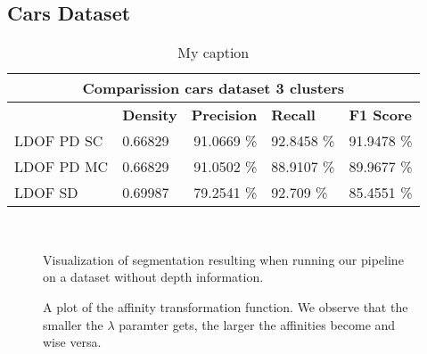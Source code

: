 \subsection{Cars Dataset}


\begin{table}[H]
\centering
\begin{tabular}{|l|l|r|l|l|}
\hline
\multicolumn{5}{|c|}{Comparission cars dataset 3 clusters}                        \\ \hline
              & \textbf{Density} & \textbf{Precision} & \textbf{Recall} & \textbf{F1 Score} \\ \hline
LDOF PD SC & 0.66829 & 91.0669 \%   & 92.8458 \%     & 91.9478 \%  \\ \hline
LDOF PD MC & 0.66829 & 91.0502 \%   & 88.9107 \%     & 89.9677 \%  \\ \hline              
LDOF SD & 0.69987 & 79.2541 \%   & 92.709 \%     & 85.4551 \%  \\ \hline
\end{tabular}
\caption[Cars Dataset]{My caption}
\label{tab:cars_ldof_quality}
\end{table}

\begin{figure}[H]
\begin{center}

~
\end{center}
\caption[Method Comparison]{Visualization of segmentation resulting when running our pipeline on a dataset without depth information.}
\label{fig:cars_dataset}
\end{figure}

\begin{figure}[H]
\centering
{}
\caption[Affinity Function]{A plot of the affinity transformation function. We observe that the smaller the $\lambda$ paramter gets, the larger the affinities become and wise versa.}
\label{fig:exp_effect_lambda}
\end{figure}

